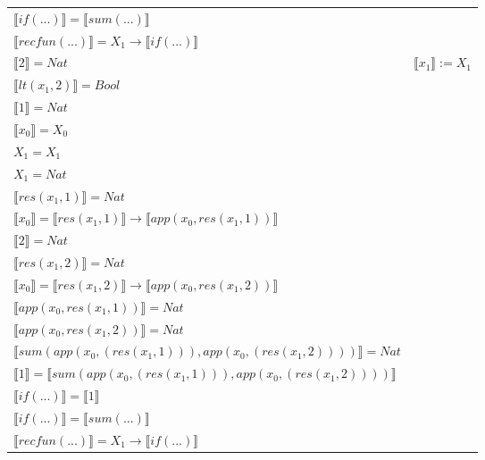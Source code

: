 \begin{exercise}
\begin{description}
\begin{center}
\begin{longtable}[!h]{ | l | l | }
                        $ \llbracket if(...) \rrbracket =  \llbracket sum(...) \rrbracket$ & \\
                        $ \llbracket recfun(...) \rrbracket =   X_1  \to  \llbracket if(...) \rrbracket $  & \\
                      \hline
                        $ \llbracket 2 \rrbracket = Nat$  & $ \llbracket x_1 \rrbracket := X_1$ \\
                        $ \llbracket lt(x_1 , 2) \rrbracket = Bool$ & \\
                        $ \llbracket 1 \rrbracket = Nat$ & \\
                        $ \llbracket x_0 \rrbracket = X_0$ & \\
                        $X_1 = X_1$ & \\
                        $X_1 = Nat$ & \\
                        $ \llbracket res(x_1,1) \rrbracket = Nat$ & \\
                        $ \llbracket x_0 \rrbracket =  \llbracket res(x_1,1) \rrbracket \to  \llbracket app(x_0, res(x_1,1)) \rrbracket$ & \\
                        $ \llbracket 2 \rrbracket = Nat$ & \\
                        $ \llbracket res(x_1,2) \rrbracket = Nat$ & \\
                        $ \llbracket x_0 \rrbracket =  \llbracket res(x_1,2) \rrbracket \to  \llbracket app(x_0, res(x_1,2)) \rrbracket$ & \\
                        $ \llbracket app(x_0, res(x_1,1)) \rrbracket = Nat$ & \\
                        $ \llbracket app(x_0, res(x_1,2)) \rrbracket = Nat$ & \\
                        $ \llbracket sum(app(x_0, (res(x_1,1))), app(x_0, (res(x_1,2))))  \rrbracket = Nat$ & \\
                        $ \llbracket 1 \rrbracket =  \llbracket sum(app(x_0, (res(x_1,1))), app(x_0, (res(x_1,2)))) \rrbracket$ & \\
                        $ \llbracket if(...) \rrbracket =  \llbracket 1 \rrbracket$ & \\
                        $ \llbracket if(...) \rrbracket =  \llbracket sum(...) \rrbracket$ & \\
                        $ \llbracket recfun(...) \rrbracket =   X_1  \to  \llbracket if(...) \rrbracket $  & \\

\end{longtable}
\end{center}
\end{description}
\end{exercise}
